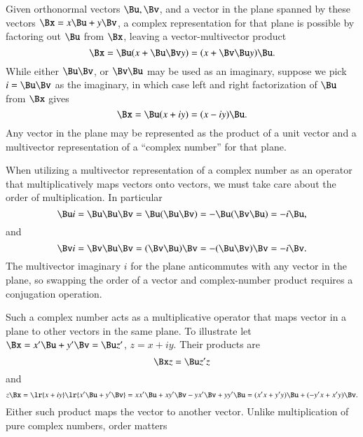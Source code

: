 Given orthonormal vectors \( \Bu, \Bv \), and a vector in the plane spanned by these vectors \( \Bx = x \Bu + y \Bv \), a complex
representation for that plane is possible by factoring out \( \Bu \) from \( \Bx \), leaving a vector-multivector product
\begin{dmath}\label{eqn:complex:3330}
\Bx = \Bu( x + \Bu \Bv y )
    = ( x + \Bv \Bu y ) \Bu.
\end{dmath}
While either \( \Bu \Bv \), or \( \Bv \Bu \) may be used as an imaginary, suppose we pick \( i = \Bu \Bv \) as the imaginary, in which case
left and right factorization of \( \Bu \) from \( \Bx \) gives
\begin{equation}\label{eqn:complex:3350}
\Bx = \Bu ( x + i y )
    = ( x - i y ) \Bu.
\end{equation}
Any vector in the plane may be represented as the product of a unit vector and a multivector representation of a ``complex number'' for that plane.

When utilizing a multivector representation of a complex number as an operator that multiplicatively maps vectors onto vectors, we must take care about the order of multiplication.  In particular
\begin{dmath}\label{eqn:complex:3410}
\Bu i
= \Bu \Bu \Bv
= \Bu (\Bu \Bv)
= -\Bu (\Bv \Bu)
= -i \Bu,
\end{dmath}
and
\begin{dmath}\label{eqn:complex:3430}
\Bv i
= \Bv \Bu \Bv
= (\Bv \Bu) \Bv
= -(\Bu \Bv) \Bv
= -i \Bv.
\end{dmath}
The multivector imaginary \( i \) for the plane anticommutes with any vector in the plane, so swapping the order of a vector and complex-number product requires a conjugation operation.

Such a complex number acts as a multiplicative operator that maps vector in a plane to other vectors in the same plane.
To illustrate let \( \Bx = x' \Bu + y' \Bv = \Bu z' \), \( z = x + i y \).  Their products are
\begin{dmath}\label{eqn:complex:3370}
\Bx z
= \Bu z' z
\end{dmath}
and
\begin{dmath}\label{eqn:complex:3390}
z \Bx
=
\lr{ x + i y }
\lr{ x' \Bu + y' \Bv }
=
x x' \Bu + x y' \Bv
- y x' \Bv + y y' \Bu
=  (x' x + y' y) \Bu + ( - y' x + x' y ) \Bv.
\end{dmath}
Either such product maps the vector to another vector.  Unlike multiplication of pure complex numbers, order matters


